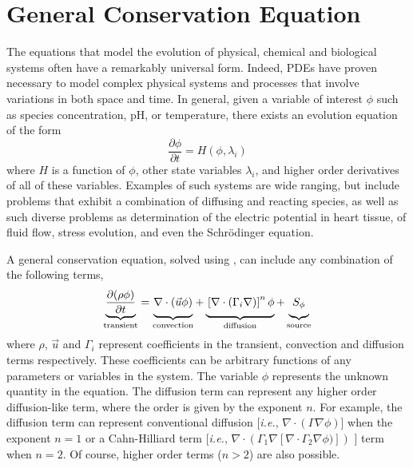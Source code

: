 \section{General Conservation Equation}
\label{sec:GeneralConservationEquation}

The equations that model the evolution of physical, chemical and
biological systems often have a remarkably universal form.  Indeed,
PDEs have proven necessary to model complex physical systems and
processes that involve variations in both space and time.  In general,
given a variable of interest \( \phi \) such as species concentration,
pH, or temperature, there exists an evolution equation of the form
\begin{equation}
  \frac{\partial \phi}{\partial t} = H(\phi, \lambda_i)
  \label{eqn:general-equation}
\end{equation}
where \( H \) is a function of \(\phi\), other state variables
\(\lambda_i\), and higher order derivatives of all of these variables.
Examples of such systems are wide ranging, but include problems that
exhibit a combination of diffusing and reacting species, as well as
such diverse problems as determination of the electric potential in
heart tissue, of fluid flow, stress evolution, and even the
Schr\"odinger equation.

A general conservation equation, solved using \FiPy{}, can include any
combination of the following terms,
\begin{equation}                        
  \underbrace{
  \frac{\partial (\rho \phi)}{\partial t}
  }_{\text{transient}}
=
\underbrace{
  \vphantom{\frac{\partial (\rho \phi)}{\partial t}}
  \nabla \cdot \left( \vec{u} \phi \right)
}_{\text{convection}}
+
\underbrace{
  \vphantom{\frac{\partial (\rho \phi)}{\partial t}}
  \left[ \nabla \cdot \left( \Gamma_i \nabla \right) \right]^n \phi
}_{\text{diffusion}}
+
\underbrace{
  \vphantom{\frac{\partial (\rho \phi)}{\partial t}}
  S_{\phi}
}_{\text{source}}
\label{eqn:num:gen}
\end{equation}
where $\rho$, $\vec{u}$ and $\Gamma_i$ represent coefficients in the
transient, convection and diffusion terms respectively.  These
coefficients can be arbitrary functions of any parameters or variables
in the system.  The variable $\phi$ represents the unknown quantity in
the equation.  The diffusion term can represent any higher order
diffusion-like term, where the order is given by the exponent $n$.
For example, the diffusion term can represent conventional diffusion
[\emph{i.e.}, $\nabla\cdot(\Gamma\nabla\phi)$] when the exponent $n =
1$ or a Cahn-Hilliard term [\emph{i.e.}, $\nabla \cdot ( \Gamma_1
\nabla [ \nabla \cdot \Gamma_2 \nabla \phi ) ] )$
\cite{CahnHilliardI,CahnHilliardII,CahnHilliardIII}] term when $n =
2$.  Of course, higher order terms ($n > 2$) are also possible.



